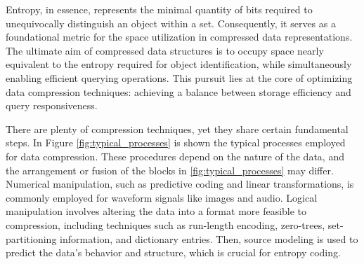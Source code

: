 Entropy, in essence, represents the minimal quantity of bits required to unequivocally distinguish an object within a set. Consequently, it serves as a foundational metric for the space utilization in compressed data representations. The ultimate aim of compressed data structures is to occupy space nearly equivalent to the entropy required for object identification, while simultaneously enabling efficient querying operations. This pursuit lies at the core of optimizing data compression techniques: achieving a balance between storage efficiency and query responsiveness. \vspace{0.4cm}

\noindent There are plenty of compression techniques, yet they share certain fundamental steps. In Figure \ref{fig:typical_processes} is shown the typical processes employed for data compression. These procedures depend on the nature of the data, and the arrangement or fusion of the blocks in \ref{fig:typical_processes} may differ. Numerical manipulation, such as predictive coding and linear transformations, is commonly employed for waveform signals like images and audio. Logical manipulation involves altering the data into a format more feasible to compression, including techniques such as run-length encoding, zero-trees, set-partitioning information, and dictionary entries. Then, source modeling is used to predict the data's behavior and structure, which is crucial for entropy coding.

